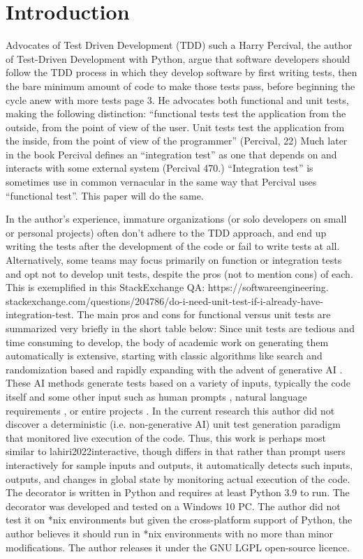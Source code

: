 \section{Introduction}\label{sec:introduction}
Advocates of Test Driven Development (TDD) such a Harry Percival,
the author of Test-Driven Development with Python,
argue that software developers should follow the TDD process in
which they develop software by first writing tests,
then the bare minimum amount of code to make those tests pass,
before beginning the cycle anew with more tests \cite{percival2014test} page 3.
%
He advocates both functional and unit tests, making the following distinction:
“functional tests test the application from the outside, from the point of view
of the user.
%
Unit tests test the application from the inside,
from the point of view of the programmer” (Percival, 22)
%
Much later in the book Percival defines an “integration test” as
one that depends on and interacts with some external system (Percival 470.)
%
“Integration test” is sometimes use in common vernacular in the same way that
Percival uses “functional test”.
%
This paper will do the same.

In the author’s experience, immature organizations (or solo developers
on small or personal projects) often don’t adhere to the TDD approach,
and end up writing the tests after the development of the code or
fail to write tests at all.
%
Alternatively, some teams may focus primarily on function or integration tests
and opt not to develop unit tests, despite the pros (not to mention cons) of
each.
%
This is exemplified in this StackExchange QA: https://softwareengineering.
%
stackexchange.com/questions/204786/do-i-need-unit-test-if-i-already-have-integration-test.
%
The main pros and cons for functional versus unit tests are summarized very
briefly in the short table below:
%
Since unit tests are tedious and time consuming to develop, the body of academic
work on generating them automatically is extensive, starting with classic
algorithms like search and randomization based \cite{Luk22Pynguin0170} and
rapidly expanding with the advent of generative AI 
\cite{bhatia2023unit,takerngsaksiri2024tdd,wang2024software}.
%
These AI methods generate tests based on a variety of inputs, typically the code
itself and some other input such as human prompts \cite{lahiri2022interactive},
natural language requirements \cite{wang2024software}, or entire projects
\cite{rao2023cat}.
%
%
In the current research this author did not discover a deterministic (i.e.
non-generative AI) unit test generation paradigm that monitored live execution
of the code.
%
Thus, this work is perhaps most similar to lahiri2022interactive, though
differs in that rather than prompt users interactively for sample inputs and
outputs, it automatically detects such inputs, outputs, and changes in global
state by monitoring actual execution of the code.
%
The decorator is written in Python and requires at least Python 3.9 to run.
%
The decorator was developed and tested on a Windows 10 PC.  The author 
did not test it on *nix environments but given the cross-platform support of
Python, the author believes it should run in *nix environments with no more than
minor modifications.
%
The author releases it under the GNU LGPL open-source licence.
